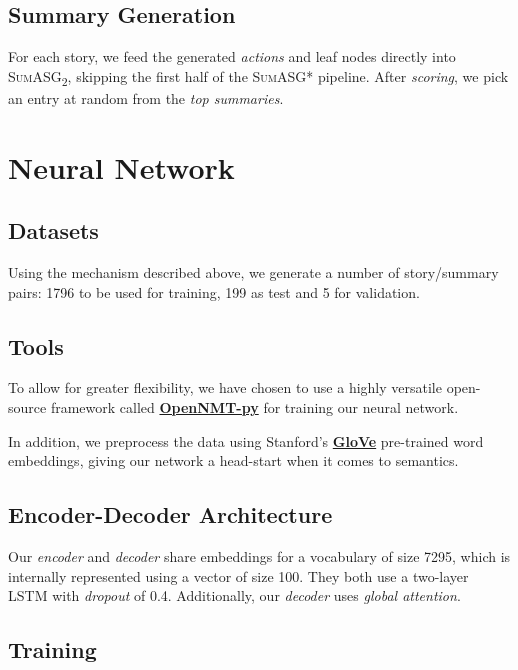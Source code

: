 \subsection{Summary Generation}

For each story, we feed the generated \textit{actions} and leaf nodes directly into \textsc{SumASG\textsubscript{2}}, skipping the first half of the \textsc{SumASG*} pipeline. After \textit{scoring}, we pick an entry at random from the \textit{top summaries}.

\section{Neural Network}

\subsection{Datasets}

Using the mechanism described above, we generate a number of story/summary pairs: 1796 to be used for training, 199 as test and 5 for validation.

\subsection{Tools}

To allow for greater flexibility, we have chosen to use a highly versatile open-source framework called \textbf{\href{https://github.com/OpenNMT/OpenNMT-py}{OpenNMT-py}} for training our neural network.

In addition, we preprocess the data using Stanford's \textbf{\href{https://nlp.stanford.edu/projects/glove/}{GloVe}} pre-trained word embeddings, giving our network a head-start when it comes to semantics.

\subsection{Encoder-Decoder Architecture}

Our \textit{encoder} and \textit{decoder} share embeddings for a vocabulary of size 7295, which is internally represented using a vector of size 100. They both use a two-layer LSTM with \textit{dropout} of 0.4. Additionally, our \textit{decoder} uses \textit{global attention}.

\subsection{Training}

